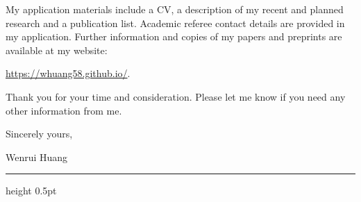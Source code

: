 \documentclass[10pt]{article}
\begin{document}
My application materials include a CV, a description of my recent and planned research and a publication list. Academic referee contact details are provided in my application. Further information and copies of my papers and preprints are available at my website:

\url{https://whuang58.github.io/}.

\medskip
Thank you for your time and consideration. Please let me know if you need any other information from me.

\vspace{0.12in}
Sincerely yours,

\vspace{0.12in}
Wenrui Huang

\vfill
\hrule height 0.5pt
\end{document}
